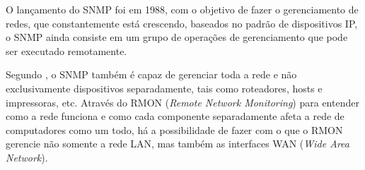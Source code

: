\par  O lançamento do SNMP foi em 1988, com o objetivo de fazer o
gerenciamento de redes, que constantemente está crescendo, baseados no padrão de
dispositivos IP, o SNMP ainda consiste em um grupo de operações de
gerenciamento que pode ser executado remotamente.

% 


\par Segundo , o SNMP também é capaz de gerenciar
toda a rede e não exclusivamente dispositivos separadamente, tais como roteadores, hosts e impressoras, etc.
Através do RMON (\textit{Remote Network Monitoring}) para entender como a rede
funciona e como cada componente separadamente afeta a rede de computadores como
um todo, há a possibilidade de fazer com o que o RMON gerencie não somente a
rede LAN, mas também as interfaces WAN (\textit{Wide Area Network}).



